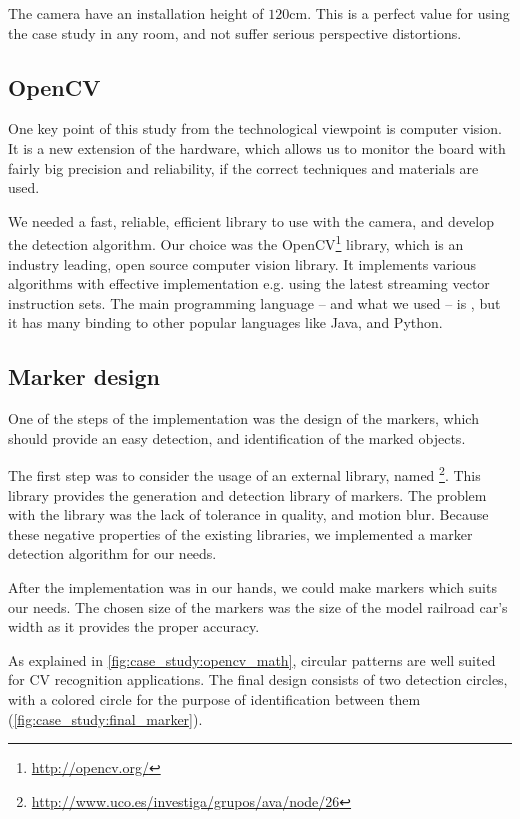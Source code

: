 The camera have an installation height of $120$\si{\centi\meter}. This is a perfect value for using the case study in any room, and not suffer serious perspective distortions.

\subsection{OpenCV}

One key point of this study from the technological viewpoint is computer vision. It is a new extension of the hardware, which allows us to monitor the board with fairly big precision and reliability, if the correct techniques and materials are used.

We needed a fast, reliable, efficient library to use with the camera, and develop the detection algorithm. Our choice was the OpenCV\footnote{\url{http://opencv.org/}} library, which is an industry leading, open source computer vision library. It implements various algorithms with effective implementation e.g. using the latest streaming vector instruction sets. The main programming language -- and what we used -- is , but it has many binding to other popular languages like Java, and Python.

\subsection{Marker design}

One of the steps of the  implementation was the design of the markers, which should provide an easy detection, and identification of the marked objects.

The first step was to consider the usage of an external library, named \footnote{\url{http://www.uco.es/investiga/grupos/ava/node/26}}. This library provides the generation and detection library of markers. The problem with the library was the lack of tolerance in quality, and motion blur. Because these negative properties of the existing libraries, we implemented a marker detection algorithm for our needs.

After the implementation was in our hands, we could make markers which suits our needs. The chosen size of the markers was the size of the model railroad car's width as it provides the proper accuracy.

As explained in \cref{fig:case_study:opencv_math}, circular patterns are well suited for CV recognition applications. The final design consists of two detection circles, with a colored circle for the purpose of identification between them (\cref{fig:case_study:final_marker}).

